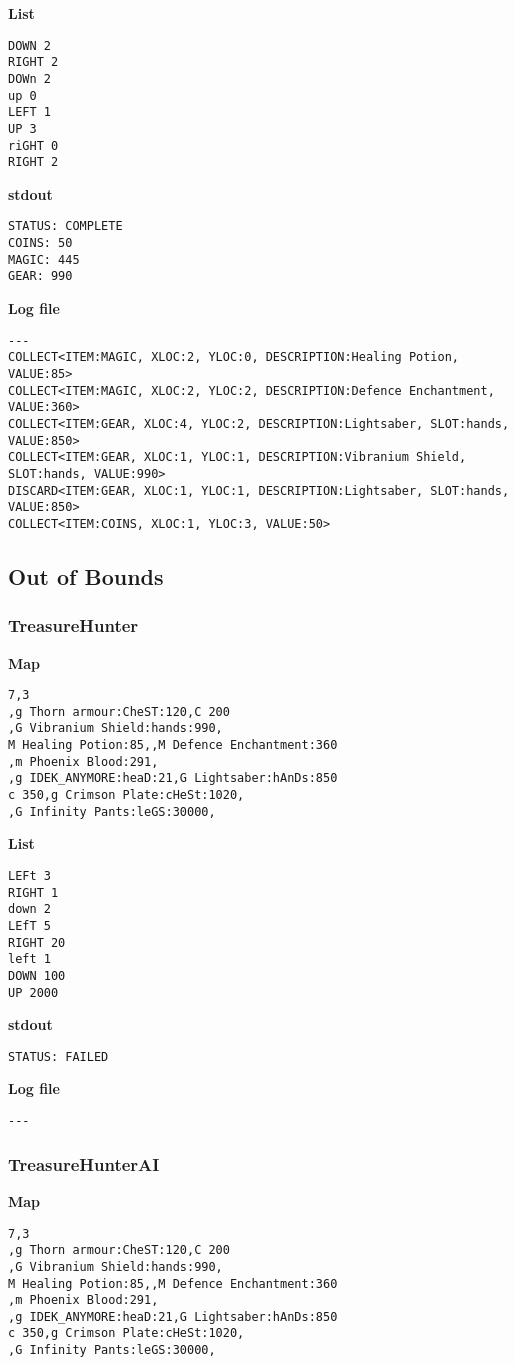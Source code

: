 \documentclass{article}
\begin{document}
\textbf{List}
\begin{lstlisting}
DOWN 2
RIGHT 2
DOWn 2
up 0
LEFT 1
UP 3
riGHT 0
RIGHT 2
\end{lstlisting}
\pagebreak

\textbf{stdout}
\begin{lstlisting}
STATUS: COMPLETE
COINS: 50
MAGIC: 445
GEAR: 990
\end{lstlisting}

\textbf{Log file}
\begin{lstlisting}
---
COLLECT<ITEM:MAGIC, XLOC:2, YLOC:0, DESCRIPTION:Healing Potion, VALUE:85>
COLLECT<ITEM:MAGIC, XLOC:2, YLOC:2, DESCRIPTION:Defence Enchantment, VALUE:360>
COLLECT<ITEM:GEAR, XLOC:4, YLOC:2, DESCRIPTION:Lightsaber, SLOT:hands, VALUE:850>
COLLECT<ITEM:GEAR, XLOC:1, YLOC:1, DESCRIPTION:Vibranium Shield, SLOT:hands, VALUE:990>
DISCARD<ITEM:GEAR, XLOC:1, YLOC:1, DESCRIPTION:Lightsaber, SLOT:hands, VALUE:850>
COLLECT<ITEM:COINS, XLOC:1, YLOC:3, VALUE:50>
\end{lstlisting}

\subsection{Out of Bounds}
\subsubsection{TreasureHunter}
\quad \textbf{Map}
\begin{lstlisting}
7,3
,g Thorn armour:CheST:120,C 200
,G Vibranium Shield:hands:990,
M Healing Potion:85,,M Defence Enchantment:360
,m Phoenix Blood:291,
,g IDEK_ANYMORE:heaD:21,G Lightsaber:hAnDs:850
c 350,g Crimson Plate:cHeSt:1020,
,G Infinity Pants:leGS:30000,
\end{lstlisting}

\textbf{List}
\begin{lstlisting}
LEFt 3
RIGHT 1
down 2
LEfT 5
RIGHT 20
left 1
DOWN 100
UP 2000
\end{lstlisting}
\pagebreak

\textbf{stdout}
\begin{lstlisting}
STATUS: FAILED
\end{lstlisting}

\textbf{Log file}
\begin{lstlisting}
---
\end{lstlisting}

\subsubsection{TreasureHunterAI}
\quad \textbf{Map}
\begin{lstlisting}
7,3
,g Thorn armour:CheST:120,C 200
,G Vibranium Shield:hands:990,
M Healing Potion:85,,M Defence Enchantment:360
,m Phoenix Blood:291,
,g IDEK_ANYMORE:heaD:21,G Lightsaber:hAnDs:850
c 350,g Crimson Plate:cHeSt:1020,
,G Infinity Pants:leGS:30000,
\end{lstlisting}
\end{document}
